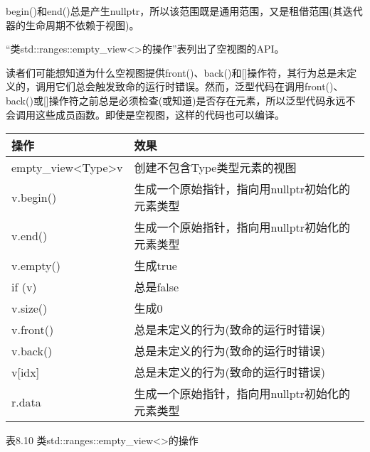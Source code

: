 begin()和end()总是产生nullptr，所以该范围既是通用范围，又是租借范围(其迭代器的生命周期不依赖于视图)。


“类std::ranges::empty\_view<>的操作”表列出了空视图的API。

读者们可能想知道为什么空视图提供front()、back()和[]操作符，其行为总是未定义的，调用它们总会触发致命的运行时错误。然而，泛型代码在调用front()、back()或[]操作符之前总是必须检查(或知道)是否存在元素，所以泛型代码永远不会调用这些成员函数。即使是空视图，这样的代码也可以编译。

\begin{longtable}[c]{|l|l|}
\hline
\textbf{操作} & \textbf{效果}                                                       \\ \hline
\endfirsthead
%
\endhead
%
empty\_view\textless{}Type\textgreater v & 创建不包含Type类型元素的视图                          \\ \hline
v.begin()                                & 生成一个原始指针，指向用nullptr初始化的元素类型 \\ \hline
v.end()            & 生成一个原始指针，指向用nullptr初始化的元素类型 \\ \hline
v.empty()          & 生成true                                                           \\ \hline
if (v)             & 总是false                                                          \\ \hline
v.size()           & 生成0                                                              \\ \hline
v.front()          & 总是未定义的行为(致命的运行时错误)                        \\ \hline
v.back()           & 总是未定义的行为(致命的运行时错误)                        \\ \hline
v{[}idx{]}         & 总是未定义的行为(致命的运行时错误)                        \\ \hline
r.data             & 生成一个原始指针，指向用nullptr初始化的元素类型 \\ \hline
\end{longtable}

\begin{center}
表8.10 类std::ranges::empty\_view<>的操作
\end{center}


